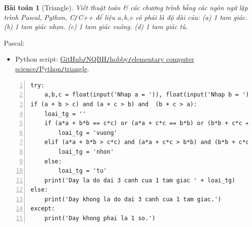 \documentclass{article}
\newtheorem{baitoan}{Bài toán}
\begin{document}
\begin{baitoan}[Triangle]
	Viết thuật toán \& các chương trình bằng các ngôn ngữ lập trình {\sf Pascal, Python, C{\tt /}C++} để liệu $a,b,c$ có phải là độ dài của: (a) 1 tam giác. (b) 1 tam giác nhọn. (c) 1 tam giác vuông. (d) 1 tam giác tù.
\end{baitoan}
\noindent Pascal: 

\begin{itemize}
	\item Python script: \href{https://github.com/NQBH/hobby/blob/master/elementary_computer_science/Python/triangle.py}{GitHub{\tt /}NQBH{\tt /}hobby{\tt /}elementary computer science{\tt /}Python{\tt /}triangle}.
\end{itemize}

\begin{Verbatim}[numbers=left,xleftmargin=5mm]
try:
    a,b,c = float(input('Nhap a = ')), float(input('Nhap b = ')), float(input('Nhap c = '))
if (a + b > c) and (a + c > b) and  (b + c > a):
    loai_tg = ''
    if (a*a + b*b == c*c) or (a*a + c*c == b*b) or (b*b + c*c == a*a):
        loai_tg = 'vuong'
    elif (a*a + b*b > c*c) and (a*a + c*c > b*b) and (b*b + c*c > a*a):
        loai_tg = 'nhon'
    else:
        loai_tg = 'tu'
    print('Day la do dai 3 canh cua 1 tam giac ' + loai_tg)
else: 
    print('Day khong la do dai 3 canh cua 1 tam giac.')			
except:
    print('Day khong phai la 1 so.')
\end{Verbatim}
\end{document}
